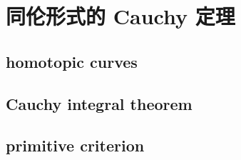 \section{同伦形式的 Cauchy 定理}
\label{b3:sec:1002}


\subsection{homotopic curves}
\label{b3:subsec:100201}

\subsection{Cauchy integral theorem}
\label{b3:subsec:100202}

\subsection{primitive criterion}
\label{b3:subsec:100203}



